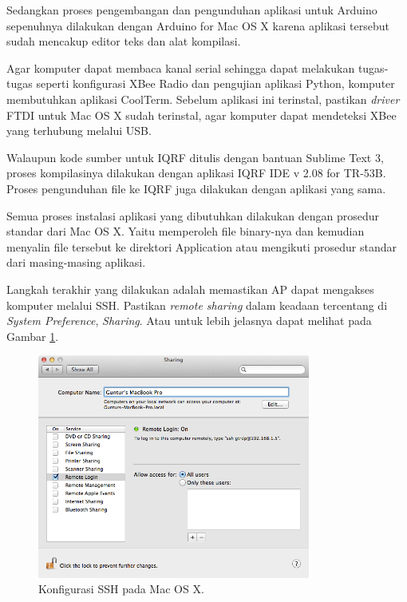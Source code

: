 				Sedangkan proses pengembangan dan pengunduhan aplikasi untuk Arduino sepenuhnya dilakukan dengan Arduino for Mac OS X karena aplikasi tersebut sudah mencakup editor teks dan alat kompilasi.

				Agar komputer dapat membaca kanal serial sehingga dapat melakukan tugas-tugas seperti konfigurasi XBee Radio dan pengujian aplikasi Python, komputer membutuhkan aplikasi CoolTerm. Sebelum aplikasi ini terinstal, pastikan \emph{driver} FTDI untuk Mac OS X sudah terinstal, agar komputer dapat mendeteksi XBee yang terhubung melalui USB.

				Walaupun kode sumber untuk IQRF ditulis dengan bantuan Sublime Text 3, proses kompilasinya dilakukan dengan aplikasi IQRF IDE v 2.08 for TR-53B. Proses pengunduhan file ke IQRF juga dilakukan dengan aplikasi yang sama.

				Semua proses instalasi aplikasi yang dibutuhkan dilakukan dengan prosedur standar dari Mac OS X. Yaitu memperoleh file binary-nya dan kemudian menyalin file tersebut ke direktori Application atau mengikuti prosedur standar dari masing-masing aplikasi.

				Langkah terakhir yang dilakukan adalah memastikan AP dapat mengakses komputer melalui SSH. Pastikan \emph{remote sharing} dalam keadaan tercentang di \emph{System Preference}, \emph{Sharing}. Atau untuk lebih jelasnya dapat melihat pada Gambar \ref{mac-sharing}.

				\begin{figure}[H]
				  \centering
				    \includegraphics[width=0.8\textwidth]{gambar/mac-sharing}
				    \caption{Konfigurasi SSH pada Mac OS X.}
				    \label{mac-sharing}
				\end{figure}

